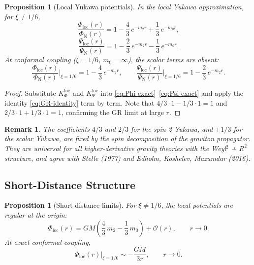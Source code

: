 \documentclass[11pt,a4paper]{article}
\newcommand{\KPhi}{K_\Phi}
\newcommand{\KPsi}{K_\Psi}
\newcommand{\order}{\mathcal{O}}
\newtheorem{proposition}[theorem]{Proposition}
\newtheorem{remark}[theorem]{Remark}
\begin{document}
\begin{proposition}[Local Yukawa potentials]
\label{prop:local-potentials}
In the local Yukawa approximation, for $\xi \neq 1/6$,
\begin{equation}\label{eq:Phi-local}
  \boxed{
  \frac{\Phi_{\mathrm{loc}}(r)}{\Phi_{\mathrm{N}}(r)}
  = 1 - \frac{4}{3}\,e^{-m_2 r} + \frac{1}{3}\,e^{-m_0 r},}
\end{equation}
\begin{equation}\label{eq:Psi-local}
  \boxed{
  \frac{\Psi_{\mathrm{loc}}(r)}{\Psi_{\mathrm{N}}(r)}
  = 1 - \frac{2}{3}\,e^{-m_2 r} - \frac{1}{3}\,e^{-m_0 r}.}
\end{equation}
At conformal coupling ($\xi = 1/6$, $m_0 = \infty$), the scalar terms
are absent:
\begin{equation}
  \frac{\Phi_{\mathrm{loc}}(r)}{\Phi_{\mathrm{N}}(r)}\bigg|_{\xi=1/6}
  = 1 - \frac{4}{3}\,e^{-m_2 r},
  \qquad
  \frac{\Psi_{\mathrm{loc}}(r)}{\Psi_{\mathrm{N}}(r)}\bigg|_{\xi=1/6}
  = 1 - \frac{2}{3}\,e^{-m_2 r}.
\end{equation}
\end{proposition}

\begin{proof}
Substitute $\KPhi^{\mathrm{loc}}$ and $\KPsi^{\mathrm{loc}}$ into
\eqref{eq:Phi-exact}--\eqref{eq:Psi-exact} and apply the identity
\eqref{eq:GR-identity} term by term.  Note that
$4/3 \cdot 1 - 1/3 \cdot 1 = 1$ and $2/3 \cdot 1 + 1/3 \cdot 1 = 1$,
confirming the GR limit at large $r$.
\end{proof}

\begin{remark}
The coefficients $4/3$ and $2/3$ for the spin-2 Yukawa, and $\pm 1/3$
for the scalar Yukawa, are fixed by the spin decomposition of the
graviton propagator.  They are universal for all higher-derivative gravity
theories with the Weyl$^2$ + $R^2$ structure, and agree with Stelle (1977)
and Edholm, Koshelev, Mazumdar (2016).
\end{remark}

\subsection{Short-Distance Structure}
\label{sec:short-distance}

\begin{proposition}[Short-distance limits]
\label{prop:short-distance}
For $\xi \neq 1/6$, the local potentials are regular at the origin:
\begin{equation}
  \Phi_{\mathrm{loc}}(r)
  = GM\left(\frac{4}{3}\,m_2 - \frac{1}{3}\,m_0\right) + \order(r),
  \qquad r \to 0.
\end{equation}
At exact conformal coupling,
\begin{equation}
  \Phi_{\mathrm{loc}}(r)\big|_{\xi=1/6}
  \sim -\frac{GM}{3r},
  \qquad r \to 0.
\end{equation}
\end{proposition}
\end{document}
